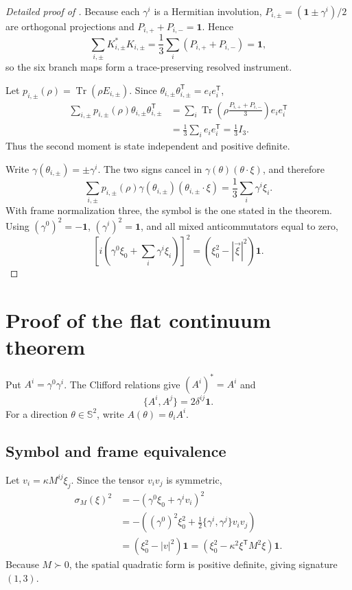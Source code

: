 \documentclass[11pt]{article}
\theoremstyle{definition}
\theoremstyle{remark}
\newcommand{\one}{\mathbf 1}
\newcommand{\Tr}{\operatorname{Tr}}
\newcommand{\Sphere}{\mathbb S}
\begin{document}
\begin{proof}[Detailed proof of ]
Because each $\gamma^i$ is a Hermitian involution,
$P_{i,\pm}=(\one\pm\gamma^i)/2$ are orthogonal projections and
$P_{i,+}+P_{i,-}=\one$.  Hence
\[
 \sum_{i,\pm}K_{i,\pm}^*K_{i,\pm}
 =\frac13\sum_i(P_{i,+}+P_{i,-})=\one,
\]
so the six branch maps form a trace-preserving resolved instrument.

Let $p_{i,\pm}(\rho)=\Tr(\rho E_{i,\pm})$.  Since
$\theta_{i,\pm}\theta_{i,\pm}^{\mathsf T}=e_ie_i^{\mathsf T}$,
\[
 \begin{aligned}
 \sum_{i,\pm}p_{i,\pm}(\rho)
 \theta_{i,\pm}\theta_{i,\pm}^{\mathsf T}
 &=\sum_i\Tr\!\left(\rho\frac{P_{i,+}+P_{i,-}}3\right)e_ie_i^{\mathsf T}\\
 &=\frac13\sum_i e_ie_i^{\mathsf T}=\frac13I_3.
 \end{aligned}
\]
Thus the second moment is state independent and positive definite.

Write $\gamma(\theta_{i,\pm})=\pm\gamma^i$.  The two signs cancel in
$\gamma(\theta)(\theta\cdot\xi)$, and therefore
\[
 \sum_{i,\pm}p_{i,\pm}(\rho)
 \gamma(\theta_{i,\pm})(\theta_{i,\pm}\cdot\xi)
 =\frac13\sum_i\gamma^i\xi_i.
\]
With frame normalization three, the symbol is the one stated in the theorem.
Using $(\gamma^0)^2=-\one$, $(\gamma^i)^2=\one$, and all mixed
anticommutators equal to zero,
\[
 \left[i\left(\gamma^0\xi_0+\sum_i\gamma^i\xi_i\right)\right]^2
 =\left(\xi_0^2-|\vec\xi|^2\right)\one.
\]
\end{proof}

\section{Proof of the flat continuum theorem}
\label{app:proof-flat-limit}

Put $A^i=\gamma^0\gamma^i$.  The Clifford relations give
$(A^i)^*=A^i$ and
\[
 \{A^i,A^j\}=2\delta^{ij}\one.
\]
For a direction $\theta\in\Sphere^2$, write
$A(\theta)=\theta_iA^i$.

\subsection{Symbol and frame equivalence}

Let $v_i=\kappa M^{ij}\xi_j$.  Since the tensor $v_iv_j$ is symmetric,
\[
 \begin{aligned}
 \sigma_M(\xi)^2
 &=-\left(\gamma^0\xi_0+\gamma^iv_i\right)^2\\
 &=-\left((\gamma^0)^2\xi_0^2
 +\tfrac12\{\gamma^i,\gamma^j\}v_iv_j\right)\\
 &=\left(\xi_0^2-|v|^2\right)\one
 =\left(\xi_0^2-\kappa^2\xi^{\mathsf T}M^2\xi\right)\one.
 \end{aligned}
\]
Because $M\succ0$, the spatial quadratic form is positive definite, giving
signature $(1,3)$.
\end{document}
